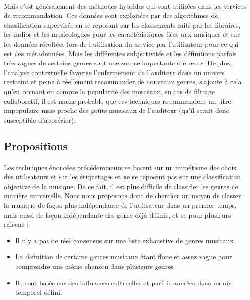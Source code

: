 \documentclass{ir}
\begin{document}
\paragraph{}
Mais c’est généralement des méthodes hybrides qui sont utilisées dans les services de recommandation. Ces 
données sont exploitées par des algorithmes de classification supervisés en se reposant sur les classements 
faits par les libraires, les radios et les musicologues pour les caractéristiques liées aux musiques et sur 
les données récoltées lors de l’utilisation du service par l’utilisateur pour ce qui est des métadonnées. 
Mais les différentes subjectivités et les définitions parfois très vagues de certains genres sont une source 
importante d’erreurs. De plus, l’analyse contextuelle favorise l’enfermement de l’auditeur dans un univers 
restreint et peine à réellement recommander de nouveaux genres, s’ajoute à cela qu’en prenant en compte la 
popularité des morceaux, en cas de filtrage collaboratif, il est moins probable que ces techniques 
recommandent un titre impopulaire mais proche des goûts musicaux de l’auditeur (qu’il serait donc 
susceptible d'apprécier).

\subsection{Propositions}
\paragraph{}
Les techniques énoncées précédemments se basent sur un mimétisme des choix des utilisateurs et sur les 
étiquetages et ne se reposent pas sur une classification objective de la musique. De ce fait, il est plus 
difficile de classifier les genres de manière universelle. Nous nous proposons donc de chercher un moyen de 
classer la musique de façon plus indépendante de l’utilisateur dans un premier temps, mais aussi de façon 
indépendante des genre déjà définis, et ce pour plusieurs raisons :
\begin{itemize}
    \item {Il n’y a pas de réel consensus sur une liste exhaustive de genres musicaux.}
    \item {La définition de certains genres musicaux étant floue et assez vague pour comprendre une même 
    chanson dans plusieurs genres.}
    \item {Ils sont basés sur des influences culturelles et parfois ancrées dans un air temporel défini.}
\end{itemize}
\end{document}
